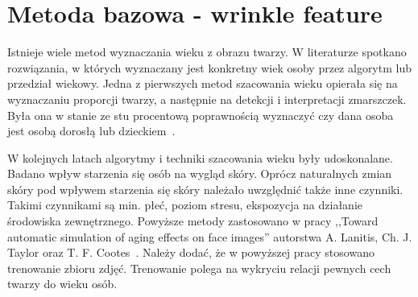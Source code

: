 \documentclass[a4paper,twoside,12pt]{book}
\begin{document}

    \chapter{Metoda bazowa - wrinkle feature}\label{ch:metoda-bazowa---wrinkle-feature}

    Istnieje wiele metod wyznaczania wieku z obrazu twarzy.
    W literaturze spotkano rozwiązania, w których wyznaczany
    jest konkretny
    wiek osoby przez algorytm lub przedział wiekowy.
    Jedna z pierwszych metod szacowania wieku opierała się na wyznaczaniu proporcji twarzy, a następnie na detekcji i
    interpretacji zmarszczek.
    Była ona w stanie ze stu procentową poprawnością wyznaczyć czy dana osoba jest osobą
    dorosłą lub
    dzieckiem~\cite{kwonLobo}.

    W kolejnych latach algorytmy i techniki szacowania wieku były udoskonalane.
    Badano wpływ starzenia się osób na
    wygląd skóry.
    Oprócz naturalnych zmian skóry pod wpływem starzenia się skóry należało uwzględnić także inne
    czynniki.
    Takimi czynnikami są min.
    płeć, poziom stresu, ekspozycja na działanie środowiska zewnętrznego.
    Powyższe metody zastosowano w pracy ,,Toward automatic simulation
    of aging effects on face images'' autorstwa A. Lanitis, Ch. J. Taylor oraz T. F. Cootes~\cite{lanitisTaylor}.
    Należy dodać, że w powyższej pracy stosowano trenowanie zbioru zdjęć.
    Trenowanie polega na wykryciu relacji pewnych cech twarzy do wieku osób.
\end{document}
